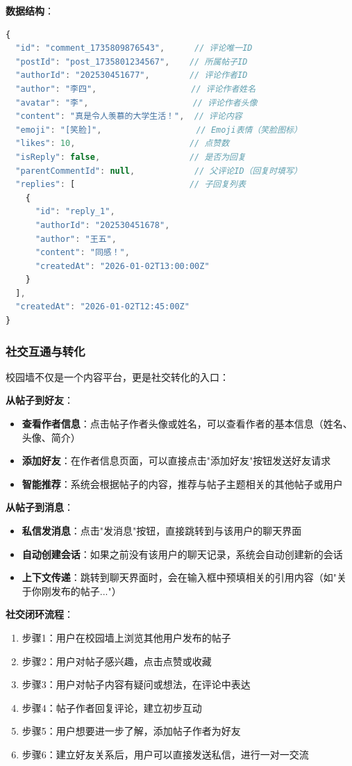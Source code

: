 \documentclass[12pt,a4paper]{article}
\begin{document}
\textbf{数据结构}：
\begin{lstlisting}[language=JavaScript]
{
  "id": "comment_1735809876543",      // 评论唯一ID
  "postId": "post_1735801234567",    // 所属帖子ID
  "authorId": "202530451677",        // 评论作者ID
  "author": "李四",                   // 评论作者姓名
  "avatar": "李",                     // 评论作者头像
  "content": "真是令人羡慕的大学生活！",  // 评论内容
  "emoji": "[笑脸]",                   // Emoji表情（笑脸图标）
  "likes": 10,                       // 点赞数
  "isReply": false,                  // 是否为回复
  "parentCommentId": null,            // 父评论ID（回复时填写）
  "replies": [                       // 子回复列表
    {
      "id": "reply_1",
      "authorId": "202530451678",
      "author": "王五",
      "content": "同感！",
      "createdAt": "2026-01-02T13:00:00Z"
    }
  ],
  "createdAt": "2026-01-02T12:45:00Z"
}
\end{lstlisting}

\subsubsection{社交互通与转化}

校园墙不仅是一个内容平台，更是社交转化的入口：

\textbf{从帖子到好友}：
\begin{itemize}
    \item \textbf{查看作者信息}：点击帖子作者头像或姓名，可以查看作者的基本信息（姓名、头像、简介）
    \item \textbf{添加好友}：在作者信息页面，可以直接点击"添加好友"按钮发送好友请求
    \item \textbf{智能推荐}：系统会根据帖子的内容，推荐与帖子主题相关的其他帖子或用户
\end{itemize}

\textbf{从帖子到消息}：
\begin{itemize}
    \item \textbf{私信发消息}：点击"发消息"按钮，直接跳转到与该用户的聊天界面
    \item \textbf{自动创建会话}：如果之前没有该用户的聊天记录，系统会自动创建新的会话
    \item \textbf{上下文传递}：跳转到聊天界面时，会在输入框中预填相关的引用内容（如"关于你刚发布的帖子..."）
\end{itemize}

\textbf{社交闭环流程}：
\begin{enumerate}
    \item 步骤1：用户在校园墙上浏览其他用户发布的帖子
    \item 步骤2：用户对帖子感兴趣，点击点赞或收藏
    \item 步骤3：用户对帖子内容有疑问或想法，在评论中表达
    \item 步骤4：帖子作者回复评论，建立初步互动
    \item 步骤5：用户想要进一步了解，添加帖子作者为好友
    \item 步骤6：建立好友关系后，用户可以直接发送私信，进行一对一交流
\end{enumerate}
\end{document}
